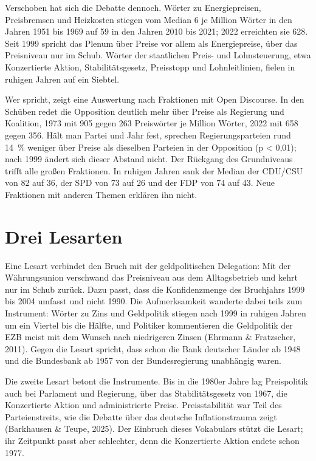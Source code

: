 \documentclass[11pt,a4paper]{article}
\begin{document}
Verschoben hat sich die Debatte dennoch. Wörter zu Energiepreisen, Preisbremsen und Heizkosten stiegen vom Median 6 je Million Wörter in den Jahren 1951 bis 1969 auf 59 in den Jahren 2010 bis 2021; 2022 erreichten sie 628. Seit 1999 spricht das Plenum über Preise vor allem als Energiepreise, über das Preisniveau nur im Schub. Wörter der staatlichen Preis- und Lohnsteuerung, etwa Konzertierte Aktion, Stabilitätsgesetz, Preisstopp und Lohnleitlinien, fielen in ruhigen Jahren auf ein Siebtel.

Wer spricht, zeigt eine Auswertung nach Fraktionen mit Open Discourse. In den Schüben redet die Opposition deutlich mehr über Preise als Regierung und Koalition, 1973 mit 905 gegen 263 Preiswörter je Million Wörter, 2022 mit 658 gegen 356. Hält man Partei und Jahr fest, sprechen Regierungsparteien rund 14~\% weniger über Preise als dieselben Parteien in der Opposition (p < 0,01); nach 1999 ändert sich dieser Abstand nicht. Der Rückgang des Grundniveaus trifft alle großen Fraktionen. In ruhigen Jahren sank der Median der CDU/CSU von 82 auf 36, der SPD von 73 auf 26 und der FDP von 74 auf 43. Neue Fraktionen mit anderen Themen erklären ihn nicht.

\section{Drei Lesarten}

Eine Lesart verbindet den Bruch mit der geldpolitischen Delegation: Mit der Währungsunion verschwand das Preisniveau aus dem Alltagsbetrieb und kehrt nur im Schub zurück. Dazu passt, dass die Konfidenzmenge des Bruchjahrs 1999 bis 2004 umfasst und nicht 1990. Die Aufmerksamkeit wanderte dabei teils zum Instrument: Wörter zu Zins und Geldpolitik stiegen nach 1999 in ruhigen Jahren um ein Viertel bis die Hälfte, und Politiker kommentieren die Geldpolitik der EZB meist mit dem Wunsch nach niedrigeren Zinsen (Ehrmann \& Fratzscher, 2011). Gegen die Lesart spricht, dass schon die Bank deutscher Länder ab 1948 und die Bundesbank ab 1957 von der Bundesregierung unabhängig waren.

Die zweite Lesart betont die Instrumente. Bis in die 1980er Jahre lag Preispolitik auch bei Parlament und Regierung, über das Stabilitätsgesetz von 1967, die Konzertierte Aktion und administrierte Preise. Preisstabilität war Teil des Parteienstreits, wie die Debatte über das deutsche Inflationstrauma zeigt (Barkhausen \& Teupe, 2025). Der Einbruch dieses Vokabulars stützt die Lesart; ihr Zeitpunkt passt aber schlechter, denn die Konzertierte Aktion endete schon 1977.
\end{document}
